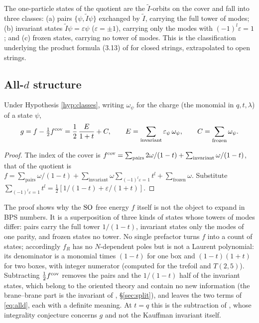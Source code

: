 \begin{hypothesis}\label{hyp:classes}
The one-particle states of the quotient are the $\tilde I$-orbits on the cover and fall into three classes: (a) pairs $\{\psi, \tilde I\psi\}$ exchanged by $\tilde I$, carrying the full tower of modes; (b) invariant states $\tilde I\psi = \varepsilon\psi$ ($\varepsilon = \pm 1$), carrying only the modes with $(-1)^l\varepsilon = 1$; and (c) frozen states, carrying no tower of modes. This is the classification underlying the product formula (3.13) of \cite{AgSc12} for closed strings, extrapolated to open strings.
\end{hypothesis}

\subsection{All-$d$ structure}\label{sec:alld}
\begin{proposition}\label{prop:alld}
Under Hypothesis \ref{hyp:classes}, writing $\omega_\psi$ for the charge (the monomial in $q, t, \lambda$) of a state $\psi$,
\begin{equation}\label{eq:alld}
g = f - \tfrac12 f^{\mathrm{cov}} = \frac12\,\frac{E}{1+t} + C,\qquad E = \sum_{\text{invariant}} \varepsilon_\psi\, \omega_\psi,\qquad C = \sum_{\text{frozen}} \omega_\psi .
\end{equation}
\end{proposition}
\begin{proof}
The index of the cover is $f^{\mathrm{cov}} = \sum_{\text{pairs}} 2\omega/(1-t) + \sum_{\text{invariant}} \omega/(1-t)$, that of the quotient is $f = \sum_{\text{pairs}} \omega/(1-t) + \sum_{\text{invariant}} \omega \sum_{(-1)^l\varepsilon = 1} t^l + \sum_{\text{frozen}} \omega$. Substitute $\sum_{(-1)^l\varepsilon = 1} t^l = \tfrac12[1/(1-t) + \varepsilon/(1+t)]$.
\end{proof}

The proof shows why the $\mathrm{SO}$ free energy $f$ itself is not the object to expand in BPS numbers. It is a superposition of three kinds of states whose towers of modes differ: pairs carry the full tower $1/(1-t)$, invariant states only the modes of one parity, and frozen states no tower. No single prefactor turns $f$ into a count of states; accordingly $f_R$ has no $N$-dependent poles but is not a Laurent polynomial: its denominator is a monomial times $(1-t)$ for one box and $(1-t)(1+t)$ for two boxes, with integer numerator (computed for the trefoil and $T(2,5)$). Subtracting $\tfrac12 f^{\mathrm{cov}}$ removes the pairs and the $1/(1-t)$ half of the invariant states, which belong to the oriented theory and contain no new information (the brane--brane part is the invariant of \cite{KN17}, \S\ref{sec:split}), and leaves the two terms of \eqref{eq:alld}, each with a definite meaning. At $t = q$ this is the subtraction of \cite{Marino09}, whose integrality conjecture concerns $g$ and not the Kauffman invariant itself.

